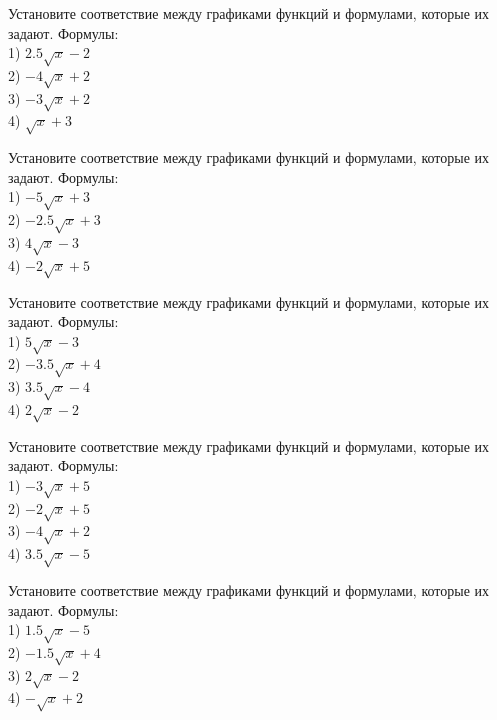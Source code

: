 \documentclass[4apaper]{article}
\begin{document}
\begin{taskBN}{36}
Установите соответствие между графиками функций и формулами, которые их задают. Формулы: \\1) $2.5\sqrt{x}-2$\\2) $-4\sqrt{x}+2$\\3) $-3\sqrt{x}+2$\\4) $\sqrt{x}+3$
\end{taskBN}

\begin{taskBN}{37}
Установите соответствие между графиками функций и формулами, которые их задают. Формулы: \\1) $-5\sqrt{x}+3$\\2) $-2.5\sqrt{x}+3$\\3) $4\sqrt{x}-3$\\4) $-2\sqrt{x}+5$
\end{taskBN}

\begin{taskBN}{38}
Установите соответствие между графиками функций и формулами, которые их задают. Формулы: \\1) $5\sqrt{x}-3$\\2) $-3.5\sqrt{x}+4$\\3) $3.5\sqrt{x}-4$\\4) $2\sqrt{x}-2$
\end{taskBN}

\begin{taskBN}{39}
Установите соответствие между графиками функций и формулами, которые их задают. Формулы: \\1) $-3\sqrt{x}+5$\\2) $-2\sqrt{x}+5$\\3) $-4\sqrt{x}+2$\\4) $3.5\sqrt{x}-5$
\end{taskBN}

\begin{taskBN}{40}
Установите соответствие между графиками функций и формулами, которые их задают. Формулы: \\1) $1.5\sqrt{x}-5$\\2) $-1.5\sqrt{x}+4$\\3) $2\sqrt{x}-2$\\4) $-\sqrt{x}+2$
\end{taskBN}
\end{document}
